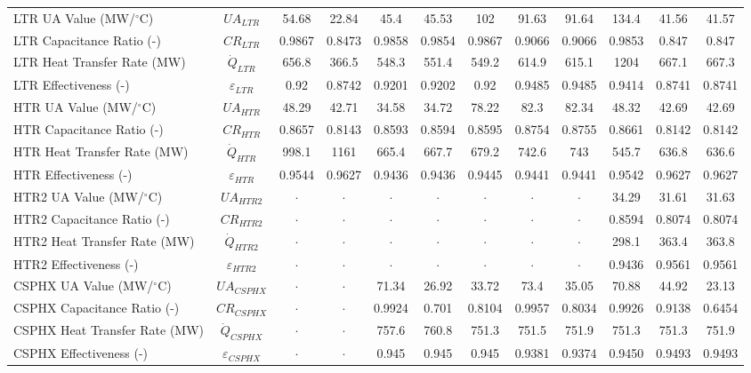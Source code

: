 \begin{specialtable}[H]
{\begin{tabular}{lc|cc|cc|ccc|ccc}
    LTR UA Value (MW/$^{\circ}$C)	&	$UA_{LTR}$	&	54.68	&	22.84	&	45.4	&	45.53	&	102	&	91.63	&	91.64	&	134.4	&	41.56	&	41.57	\\
    LTR Capacitance Ratio (-)	&	$CR_{LTR}$	&	0.9867	&	0.8473	&	0.9858	&	0.9854	&	0.9867	&	0.9066	&	0.9066	&	0.9853	&	0.847	&	0.847	\\
    LTR Heat Transfer Rate (MW)	&	$\dot{Q}_{LTR}$	&	656.8	&	366.5	&	548.3	&	551.4	&	549.2	&	614.9	&	615.1	&	1204	&	667.1	&	667.3	\\
    LTR Effectiveness (-)	&	$\varepsilon_{LTR}$	&	0.92	&	0.8742	&	0.9201	&	0.9202	&	0.92	&	0.9485	&	0.9485	&	0.9414	&	0.8741	&	0.8741	\\
    HTR UA Value (MW/$^{\circ}$C)	&	$UA_{HTR}$	&	48.29	&	42.71	&	34.58	&	34.72	&	78.22	&	82.3	&	82.34	&	48.32	&	42.69	&	42.69	\\
    HTR Capacitance Ratio (-)	&	$CR_{HTR}$	&	0.8657	&	0.8143	&	0.8593	&	0.8594	&	0.8595	&	0.8754	&	0.8755	&	0.8661	&	0.8142	&	0.8142	\\
    HTR Heat Transfer Rate (MW)	&	$\dot{Q}_{HTR}$	&	998.1	&	1161	&	665.4	&	667.7	&	679.2	&	742.6	&	743	&	545.7	&	636.8	&	636.6	\\
    HTR Effectiveness (-)	&	$\varepsilon_{HTR}$	&	0.9544	&	0.9627	&	0.9436	&	0.9436	&	0.9445	&	0.9441	&	0.9441	&	0.9542	&	0.9627	&	0.9627	\\
    HTR2 UA Value (MW/$^{\circ}$C)	&	$UA_{HTR2}$	&	$\cdot$	&	$\cdot$	&	$\cdot$	&	$\cdot$	&	$\cdot$	&	$\cdot$	&	$\cdot$	&	34.29	&	31.61	&	31.63	\\
    HTR2 Capacitance Ratio (-)	&	$CR_{HTR2}$	&	$\cdot$	&	$\cdot$	&	$\cdot$	&	$\cdot$	&	$\cdot$	&	$\cdot$	&	$\cdot$	&	0.8594	&	0.8074	&	0.8074	\\
    HTR2 Heat Transfer Rate (MW)	&	$\dot{Q}_{HTR2}$	&	$\cdot$	&	$\cdot$	&	$\cdot$	&	$\cdot$	&	$\cdot$	&	$\cdot$	&	$\cdot$	&	298.1	&	363.4	&	363.8	\\
    HTR2 Effectiveness (-)	&	$\varepsilon_{HTR2}$	&	$\cdot$	&	$\cdot$	&	$\cdot$	&	$\cdot$	&	$\cdot$	&	$\cdot$	&	$\cdot$	&	0.9436	&	0.9561	&	0.9561	\\
    CSPHX UA Value (MW/$^{\circ}$C)	&	$UA_{CSPHX}$	&	$\cdot$	&	$\cdot$	&	71.34	&	26.92	&	33.72	&	73.4	&	35.05	&	70.88	&	44.92	&	23.13	\\
    CSPHX Capacitance Ratio (-)	&	$CR_{CSPHX}$	&	$\cdot$	&	$\cdot$	&	0.9924	&	0.701	&	0.8104	&	0.9957	&	0.8034	&	0.9926	&	0.9138	&	0.6454	\\
    CSPHX Heat Transfer Rate (MW)	&	$\dot{Q}_{CSPHX}$	&	$\cdot$	&	$\cdot$	&	757.6	&	760.8	&	751.3	&	751.5	&	751.9	&	751.3	&	751.3	&	751.9	\\
    CSPHX Effectiveness (-)	&	$\varepsilon_{CSPHX}$	&	$\cdot$	&	$\cdot$	&	0.945	&	0.945	&	0.945	&	0.9381	&	0.9374	&	0.9450	&	0.9493	&	0.9493	\\
    \bottomrule
    \end{tabular}
    }
\end{specialtable}
